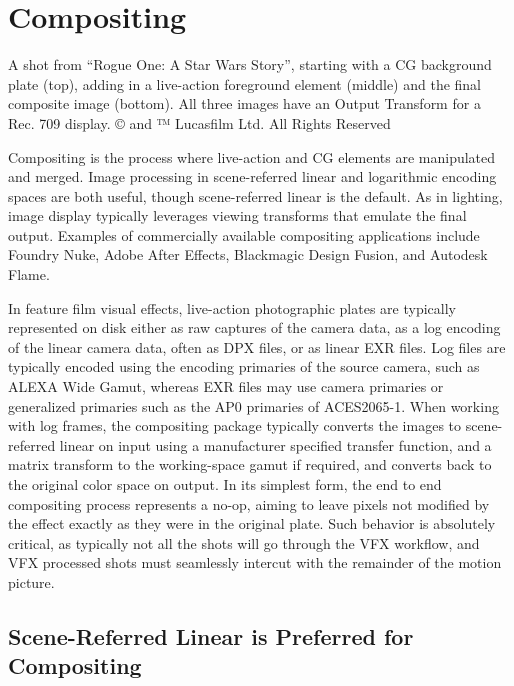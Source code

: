 \section{Compositing}
\label{sec:compositing}




A shot from “Rogue One: A Star Wars Story”, starting with a CG background plate (top), adding in a live-action foreground element (middle) and the final composite image (bottom). All three images have an Output Transform for a Rec. 709 display.
© and ™ Lucasfilm Ltd. All Rights Reserved

Compositing is the process where live-action and CG elements are manipulated and merged. Image processing in scene-referred linear and logarithmic encoding spaces are both useful, though scene-referred linear is the default. As in lighting, image display typically leverages viewing transforms that emulate the final output. Examples of commercially available compositing applications include Foundry Nuke, Adobe After Effects, Blackmagic Design Fusion, and Autodesk Flame.

In feature film visual effects, live-action photographic plates are typically represented on disk either as raw captures of the camera data, as a log encoding of the linear camera data, often as DPX files, or as linear EXR files. Log files are typically encoded using the encoding primaries of the source camera, such as ALEXA Wide Gamut, whereas EXR files may use camera primaries or generalized primaries such as the AP0 primaries of ACES2065-1.  When working with log frames, the compositing package typically converts the images to scene-referred linear on input using a manufacturer specified transfer function, and a matrix transform to the working-space gamut if required, and converts back to the original color space on output. In its simplest form, the end to end compositing process represents a no-op, aiming to leave pixels not modified by the effect exactly as they were in the original plate. Such behavior is absolutely critical, as typically not all the shots will go through the VFX workflow, and VFX processed shots must seamlessly intercut with the remainder of the motion picture.

\subsection{Scene-Referred Linear is Preferred for Compositing}
\label{subsec:scene-referred-linear-is-preferred-for-compositing}

